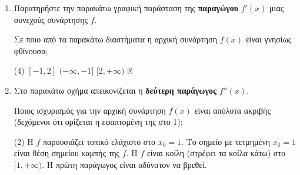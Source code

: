 \documentclass[11pt,a4paper]{article}
\renewcommand{\textdexiakeraia}{}
\begin{document}
\begin{enumerate}[label=\textbf{\arabic*.}, itemsep=4mm]
    \newpage
    \item Παρατηρήστε την παρακάτω γραφική παράσταση της \textbf{παραγώγου} $f'(x)$ μιας συνεχούς συνάρτησης $f$.
    \begin{center}
    \end{center}
    Σε ποιο από τα παρακάτω διαστήματα η αρχική συνάρτηση $f(x)$ είναι γνησίως φθίνουσα;
    \begin{tasks}[label=\let\textdexiakeraia\relax\alph*.](4)
        \task $[ -1, 2 ]$
        \task $(-\infty, -1]$
        \task $[2, +\infty)$
        \task $\mathbb{R}$
    \end{tasks}

    \item Στο παρακάτω σχήμα απεικονίζεται η \textbf{δεύτερη παράγωγος} $f''(x)$. 
    \begin{center}
    \end{center}
    Ποιος ισχυρισμός για την αρχική συνάρτηση $f(x)$ είναι απόλυτα ακριβής (δεχόμενοι ότι ορίζεται η εφαπτομένη της στο 1);
    \begin{tasks}[label=\let\textdexiakeraia\relax\alph*.](2)
        \task Η $f$ παρουσιάζει τοπικό ελάχιστο στο $x_0 = 1$.
        \task Το σημείο με τετμημένη $x_0 = 1$ είναι θέση σημείου καμπής της $f$.
        \task Η $f$ είναι κοίλη (στρέφει τα κοίλα κάτω) στο $[1, +\infty)$.
        \task Η πρώτη παράγωγος είναι αδύνατον να βρεθεί.
    \end{tasks}


\end{enumerate}
\end{document}
